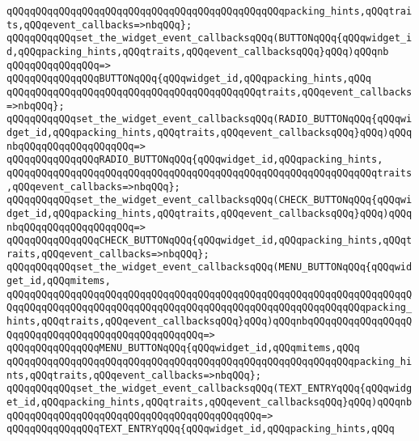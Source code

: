 \verb|qQQqqQQqqQQqqQQqqQQqqQQqqQQqqQQqqQQqqQQqqQQqqQQqpacking_hints,qQQqtraits,qQQqevent_callbacks=>nbqQQq};|\newline
\verb|qQQqqQQqqQQqset_the_widget_event_callbacksqQQq(BUTTONqQQq{qQQqwidget_id,qQQqpacking_hints,qQQqtraits,qQQqevent_callbacksqQQq}qQQq)qQQqnb|\newline
\verb|qQQqqQQqqQQqqQQq=>|\newline
\verb|qQQqqQQqqQQqqQQqBUTTONqQQq{qQQqwidget_id,qQQqpacking_hints,qQQq|\newline
\verb|qQQqqQQqqQQqqQQqqQQqqQQqqQQqqQQqqQQqqQQqqQQqtraits,qQQqevent_callbacks=>nbqQQq};|\newline
\verb|qQQqqQQqqQQqset_the_widget_event_callbacksqQQq(RADIO_BUTTONqQQq{qQQqwidget_id,qQQqpacking_hints,qQQqtraits,qQQqevent_callbacksqQQq}qQQq)qQQqnbqQQqqQQqqQQqqQQqqQQq=>|\newline
\verb|qQQqqQQqqQQqqQQqRADIO_BUTTONqQQq{qQQqwidget_id,qQQqpacking_hints,|\newline
\verb|qQQqqQQqqQQqqQQqqQQqqQQqqQQqqQQqqQQqqQQqqQQqqQQqqQQqqQQqqQQqqQQqtraits,qQQqevent_callbacks=>nbqQQq};|\newline
\verb|qQQqqQQqqQQqset_the_widget_event_callbacksqQQq(CHECK_BUTTONqQQq{qQQqwidget_id,qQQqpacking_hints,qQQqtraits,qQQqevent_callbacksqQQq}qQQq)qQQqnbqQQqqQQqqQQqqQQqqQQq=>|\newline
\verb|qQQqqQQqqQQqqQQqCHECK_BUTTONqQQq{qQQqwidget_id,qQQqpacking_hints,qQQqtraits,qQQqevent_callbacks=>nbqQQq};|\newline
\verb|qQQqqQQqqQQqset_the_widget_event_callbacksqQQq(MENU_BUTTONqQQq{qQQqwidget_id,qQQqmitems,|\newline
\verb|qQQqqQQqqQQqqQQqqQQqqQQqqQQqqQQqqQQqqQQqqQQqqQQqqQQqqQQqqQQqqQQqqQQqqQQqqQQqqQQqqQQqqQQqqQQqqQQqqQQqqQQqqQQqqQQqqQQqqQQqqQQqqQQqqQQqpacking_hints,qQQqtraits,qQQqevent_callbacksqQQq}qQQq)qQQqnbqQQqqQQqqQQqqQQqqQQqqQQqqQQqqQQqqQQqqQQqqQQqqQQqqQQq=>|\newline
\verb|qQQqqQQqqQQqqQQqMENU_BUTTONqQQq{qQQqwidget_id,qQQqmitems,qQQq|\newline
\verb|qQQqqQQqqQQqqQQqqQQqqQQqqQQqqQQqqQQqqQQqqQQqqQQqqQQqqQQqqQQqpacking_hints,qQQqtraits,qQQqevent_callbacks=>nbqQQq};|\newline
\verb|qQQqqQQqqQQqset_the_widget_event_callbacksqQQq(TEXT_ENTRYqQQq{qQQqwidget_id,qQQqpacking_hints,qQQqtraits,qQQqevent_callbacksqQQq}qQQq)qQQqnbqQQqqQQqqQQqqQQqqQQqqQQqqQQqqQQqqQQqqQQqqQQq=>|\newline
\verb|qQQqqQQqqQQqqQQqTEXT_ENTRYqQQq{qQQqwidget_id,qQQqpacking_hints,qQQq|\newline
